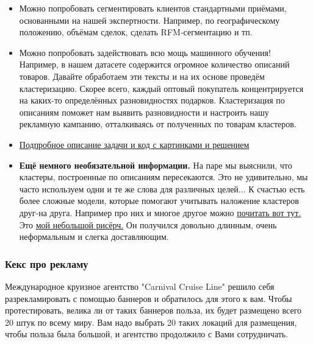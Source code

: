\documentclass[12pt, a4paper, oneside]{article}
\begin{document}
\begin{itemize}
	\item Можно попробовать сегментировать клиентов стандартными приёмами, основанными на нашей экспертности. Например, по географическому положению, объёмам сделок, сделать RFM-сегментацию и тп.  
	
	\item Можно попробовать задействовать всю мощь машинного обучения! Например, в нашем датасете содержится огромное количество описаний товаров. Давайте обработаем эти тексты и на их основе проведём кластеризацию. Скорее всего, каждый оптовый покупатель концентрируется на каких-то определённых разновидностях подарков. Кластеризация по описаниям поможет нам выявить разновидности и настроить нашу рекламную кампанию, отталкиваясь от полученных по товарам кластеров. 
	
	\item \href{http://nbviewer.jupyter.org/github/FUlyankin/HSE_Data_Culture/blob/master/ML%20for%20marketing%202018%20autumn/sem_23/1.1%20Segmantation_clusterization.ipynb}{Подпробное описание задачи и код с картинками и решением} 
	
	\item  \textbf{Ещё немного необязательной информации.}  На паре мы выяснили, что кластеры, построенные по описаниям пересекаются. Это не удивительно, мы часто используем одни и те же слова для различных целей... К счастью есть более сложные модели, которые помогают учитывать наложение кластеров друг-на друга. Например про них и многое другое можно \href{http://nbviewer.jupyter.org/github/FUlyankin/ekanam_grand_research/blob/master/Posts/3.1%20Public_clusters.ipynb}{почитать вот тут.} Это \href{http://nbviewer.jupyter.org/github/FUlyankin/ekanam_grand_research/blob/master/Posts/0.%20Introduction.ipynb}{мой небольшой рисёрч.} Он получился довольно длинным, очень неформальным и слегка доставляющим. 
\end{itemize}


\subsubsection*{Кекс про рекламу}

Международное круизное агентство "Carnival Cruise Line" решило себя разрекламировать с помощью баннеров и обратилось для этого к вам. Чтобы протестировать, велика ли от таких баннеров польза, их будет размещено всего 20 штук по всему миру. Вам надо выбрать 20 таких локаций для размещения, чтобы польза была большой, и агентство продолжило с Вами сотрудничать.
\end{document}
